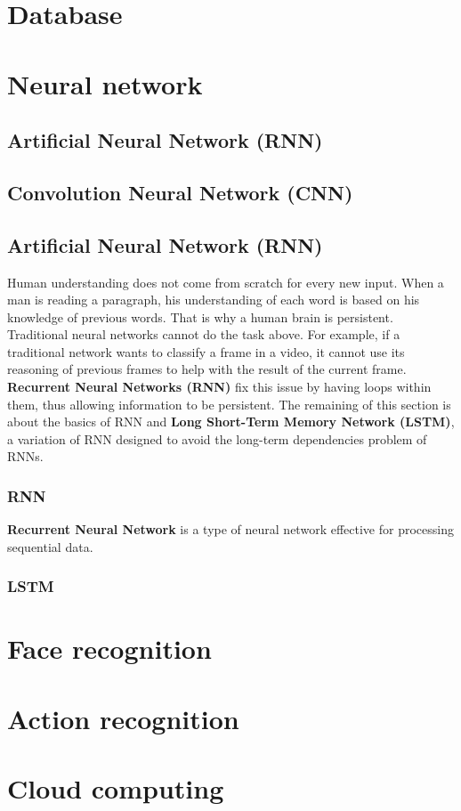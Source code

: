 \section{Database}
\section{Neural network}
\subsection{Artificial Neural Network (RNN)}
\subsection{Convolution Neural Network (CNN)}

\subsection{Artificial Neural Network (RNN)}
Human understanding does not come from scratch for every new input. When a man is reading a paragraph, his understanding of each word is based on his knowledge of previous words. That is why a human brain is persistent.\\
Traditional neural networks cannot do the task above. For example, if a traditional network wants to classify a frame in a video, it cannot use its reasoning of previous frames to help with the result of the current frame.
\textbf{Recurrent Neural Networks (RNN)} fix this issue by having loops within them, thus allowing information to be persistent. The remaining of this section is about the basics of RNN and \textbf{Long Short-Term Memory Network (LSTM)}, a variation of RNN designed to avoid the long-term dependencies problem of RNNs.
\subsubsection{RNN}
\textbf{Recurrent Neural Network} is a type of neural network effective for processing sequential data.
\subsubsection{LSTM}

\section{Face recognition}
\section{Action recognition}
\section{Cloud computing}
